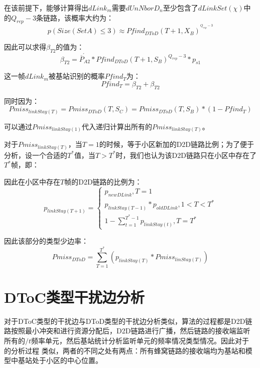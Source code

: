 \documentclass[figurelist,tablelist,algorithmlist,nomlist,masters]{seuthesix}
\begin{document}
	在该前提下，能够计算得出$dLink_m$需要$dUnNborD_n$至少包含了$dLinkSet(\chi )$中的$Q_{rep} - 3$条链路，该概率大约为：
	\begin{equation}\label{eq3.1}
		p(Size(SetA) \le 3) \approx Pfin{d_{DToD}}{(T + 1,X_B)^{^{Q_{rep} - 3}}}
	\end{equation}

	因此可以求得$\beta _{T2}$的值为：
	\begin{equation}\label{eq3.1}
		\beta _{T2} = \acute{\overline P _{A2}} * Pfin{d_{DToD}}{(T + 1,S_B)^{Q_{rep} - 3}}*{p_{s1}}
	\end{equation}

	这一帧$dLink_m$被基站识别的概率$Pfin{d_T}$为：
	\begin{equation}\label{eq3.1}
		Pfin{d_T} = \beta _{T2} + \beta _{T2}
	\end{equation}

	同时因为：
	\begin{equation}\label{eq3.1}
		Pmis{s_{linkStay(T)}} = Pmis{s_{DToD}}(T,S_C) = Pmis{s_{DToD}}(T,S_B)*(1 - Pfin{d_T})
	\end{equation}

	可以通过$Pmis{s_{linkStay(1)}}$代入递归计算出所有的$Pmis{s_{linkStay(T)}}$。

	对于$Pmis{s_{linkStay(T)}}$，当$T=1$的时候，等于小区新加的D2D链路比例；为了便于分析，设一个合适的$T^*$值，当$T > T^*$时，我们也认为该D2D链路只在小区中存在了$T^*$帧，即：

	因此在小区中存在$T$帧的D2D链路的比例为：
	\begin{equation}\label{eq3.1}
	{p_{linkStay(T + 1)}} = \left\{ \begin{array}{l}
	{p_{newDLink}},T = 1\\
	{p_{linkStay(T - 1)}}*{p_{oldDLink}},1 < T < T^* \\
	1 - \sum\limits_{t = 1}^{{T^*} - 1} {{p_{linkStay(t)}}} ,T = T^*
	\end{array} \right.
	\end{equation}

	因此该部分的类型少边率：
	\begin{equation}\label{eq3.1}
	Pmis{s_{DToD}} = \sum\limits_{T = 1}^{{T^*}} {({p_{linkStay(T)}}*Pmis{s_{linStay(T)}})}
	\end{equation}


	\section{DToC类型干扰边分析}
	对于DToC类型的干扰边与DToD类型的干扰边分析类似，算法的过程都是D2D链路按照最小冲突和进行资源分配后，D2D链路进行广播，然后链路的接收端监听所有的$/t$频率单元，然后基站统计分析监听单元的频率情况类型情况。因此对于 的分析过程 类似，两者的不同之处有两点：所有蜂窝链路的接收端均为基站和模型中基站处于小区的中心位置。
\end{document}
